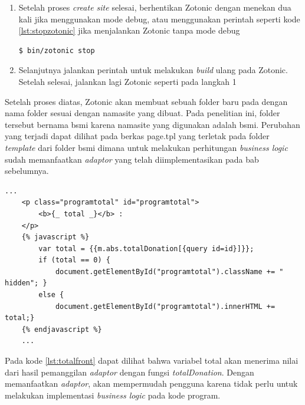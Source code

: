 \begin{enumerate}
	\item Setelah proses \textit{create site} selesai, berhentikan Zotonic dengan menekan  dua kali jika menggunakan mode debug, atau menggunakan perintah seperti kode \ref{lst:stopzotonic} jika menjalankan Zotonic tanpa mode debug
	\begin{minipage}{\linewidth}
		\begin{lstlisting}[caption={Perintah untuk memberhentikan Zotonic},label={lst:stopzotonic}]
		$ bin/zotonic stop
		\end{lstlisting}
	\end{minipage}

	\item Selanjutnya jalankan perintah  untuk melakukan \textit{build} ulang pada Zotonic. Setelah selesai, jalankan lagi Zotonic seperti pada langkah 1
	
\end{enumerate}

Setelah proses diatas, Zotonic akan membuat sebuah folder baru pada  dengan nama folder sesuai dengan namasite yang dibuat. Pada penelitian ini, folder tersebut bernama bsmi karena namasite yang digunakan adalah bsmi. Perubahan yang terjadi dapat dilihat pada berkas page.tpl yang terletak pada folder \textit{template} dari folder bsmi dimana untuk melakukan perhitungan \textit{business logic} sudah memanfaatkan \textit{adaptor} yang telah diimplementasikan pada bab sebelumnya.
\begin{minipage}{\linewidth}
	\begin{lstlisting}[caption={\textit{Business logic} untuk fungsi total pada kategori program},label={lst:totalfront}]
	...
	<p class="programtotal" id="programtotal">
		<b>{_ total _}</b> : 
	</p>
	{% javascript %} 
		var total = {{m.abs.totalDonation[{query id=id}]}}; 
		if (total == 0) {
			document.getElementById("programtotal").className += " hidden"; } 
		else { 
			document.getElementById("programtotal").innerHTML += total;}
	{% endjavascript %}
	...
	\end{lstlisting}
\end{minipage}

Pada kode \ref{lst:totalfront} dapat dilihat bahwa variabel total akan menerima nilai dari hasil pemanggilan \textit{adaptor} dengan fungsi \textit{totalDonation}. Dengan memanfaatkan \textit{adaptor}, akan mempermudah pengguna karena tidak perlu untuk melakukan implementasi \textit{business logic} pada kode program.
